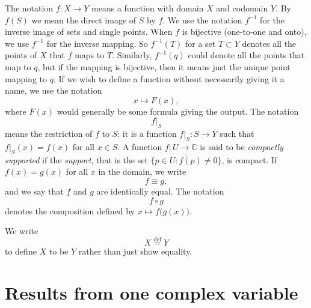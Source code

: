 \documentclass[12pt,openany]{book}
\newcommand{\C}{{\mathbb{C}}}
\newcommand{\myindex}[1]{#1\index{#1}}
\theoremstyle{plain}
\theoremstyle{remark}
\theoremstyle{definition}
\theoremstyle{exercise}
\theoremstyle{example}
\begin{document}
%
The notation $f \colon X \to Y$ means a function with domain $X$ and
codomain $Y$.  By $f(S)$ we mean the direct image of $S$ by $f$.
We use the notation $f^{-1}$ for the inverse image of sets and
single points.  When $f$ is bijective (one-to-one and onto),
we use $f^{-1}$ for the inverse mapping.  So $f^{-1}(T)$ for
a set $T \subset Y$ denotes all the points of $X$ that $f$ maps to $T$.
Similarly, $f^{-1}(q)$ could denote all the points that map to $q$,
but if the mapping is bijective, then it means just the unique point
mapping to $q$.
If we wish to define a function without necessarily giving it a name, we use
the notation
%
\begin{equation*}
x \mapsto F(x),
\end{equation*}
where $F(x)$ would generally be some formula giving the output.
The notation
%
\begin{equation*}
f|_S
\end{equation*}
means the restriction of $f$ to $S$:
it is a function
$f|_S \colon S \to Y$ such that $f|_S(x) = f(x)$ for all $x \in S$.
A function $f \colon U \to \C$ is said to be
\emph{\myindex{compactly supported}} if
the \emph{\myindex{support}}, that is the set
$\overline{\{ p \in U : f(p) \not= 0 \}}$, is compact.
If $f(x) = g(x)$ for all $x$ in the domain,
we write
%
\begin{equation*}
f \equiv g ,
\end{equation*}
and we say that $f$ and $g$ are identically equal.
The notation
%
\begin{equation*}
f \circ g
\end{equation*}
denotes the composition defined by $x \mapsto
f\bigl(g(x)\bigr)$.

We write
%
\begin{equation*}
X
\overset{\text{def}}{=}
Y
\end{equation*}
to define $X$ to be $Y$ rather than just show equality.



\chapter{Results from one complex variable} \label{ap:onevarresults}
\end{document}
